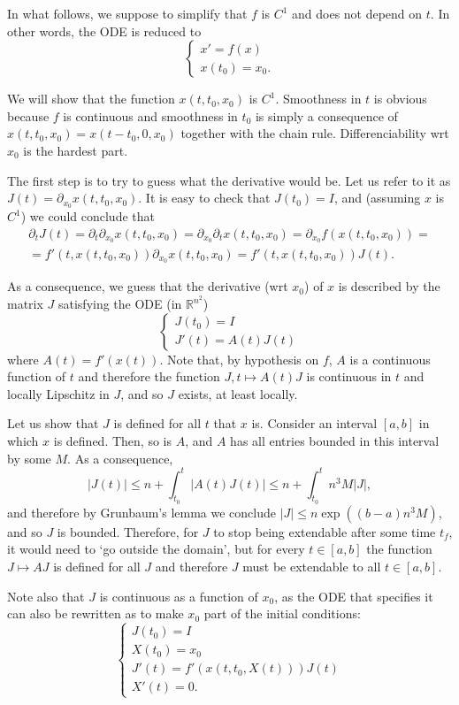 \documentclass{article}
\newcommand{\R}{\mathbb{R}}
\begin{document}
In what follows, we suppose to simplify that $f$ is $C^1$ and does not depend on $t$. In other words, the ODE is reduced to
\[
\begin{cases}
x' = f(x)\\
x(t_0) = x_0.
\end{cases}
\]

We will show that the function $x(t,t_0,x_0)$ is $C^1$. Smoothness in $t$ is obvious because $f$ is continuous and smoothness in $t_0$ is simply a consequence of $x(t,t_0,x_0) = x(t-t_0, 0, x_0)$ together with the chain rule. Differenciability wrt $x_0$ is the hardest part.

The first step is to try to guess what the derivative would be. Let us refer to it as $J(t) = \partial_{x_0} x(t,t_0,x_0)$. It is easy to check that $J(t_0) = I$, and (assuming $x$ is $C^1$) we could conclude that
\begin{multline*}
\partial_t J(t) = \partial_t \partial_{x_0} x(t,t_0,x_0) = \partial_{x_0} \partial_t x(t,t_0,x_0) = \partial_{x_0} f(x(t,t_0,x_0)) =\\
= f'(t, x(t,t_0,x_0)) \partial_{x_0} x(t,t_0,x_0) = f'(t, x(t,t_0,x_0)) J(t).
\end{multline*}

As a consequence, we guess that the derivative (wrt $x_0$) of $x$ is described by the matrix $J$ satisfying the ODE (in $\R^{n^2}$)
\[
\begin{cases}
J(t_0) = I\\
J'(t) = A(t) J(t)
\end{cases}
\]
where $A(t) = f'(x(t))$. Note that, by hypothesis on $f$, $A$ is a continuous function of $t$ and therefore the function $J, t \mapsto A(t) J$ is continuous in $t$ and locally Lipschitz in $J$, and so $J$ exists, at least locally.

Let us show that $J$ is defined for all $t$ that $x$ is. Consider an interval $[a,b]$ in which $x$ is defined. Then, so is $A$, and $A$ has all entries bounded in this interval by some $M$. As a consequence,
\[\lvert J(t) \rvert \leq n + \int_{t_0}^t \lvert A(t) J(t) \rvert \leq n + \int_{t_0}^t n^3 M \lvert J \rvert,\]
and therefore by Grunbaum's lemma we conclude $\lvert J \rvert \leq n \exp((b-a) n^3 M)$, and so $J$ is bounded. Therefore, for $J$ to stop being extendable after some time $t_f$, it would need to `go outside the domain', but for every $t \in [a,b]$ the function $J \mapsto AJ$ is defined for all $J$ and therefore $J$ must be extendable to all $t \in [a,b]$.

Note also that $J$ is continuous as a function of $x_0$, as the ODE that specifies it can also be rewritten as to make $x_0$ part of the initial conditions:
\[
\begin{cases}
J(t_0) = I\\
X(t_0) = x_0\\
J'(t) = f'(x(t,t_0,X(t))) J(t)\\
X'(t) = 0.
\end{cases}
\]
\end{document}
